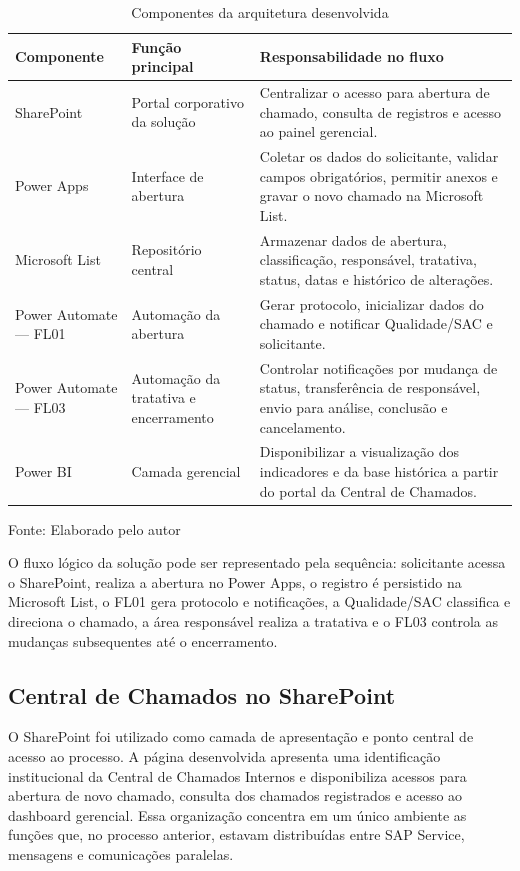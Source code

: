 \begin{table}[H]
\caption{Componentes da arquitetura desenvolvida}
\label{tab:arquitetura-desenvolvida}
\centering
\begin{tabular}{p{3.0cm} p{4.1cm} p{5.1cm}}
\hline
\textbf{Componente} & \textbf{Função principal} &
\textbf{Responsabilidade no fluxo} \\
\hline
SharePoint &
Portal corporativo da solução &
Centralizar o acesso para abertura de chamado, consulta de
registros e acesso ao painel gerencial. \\
\hline
Power Apps &
Interface de abertura &
Coletar os dados do solicitante, validar campos
obrigatórios, permitir anexos e gravar o novo chamado na
Microsoft List. \\
\hline
Microsoft List &
Repositório central &
Armazenar dados de abertura, classificação, responsável,
tratativa, status, datas e histórico de alterações. \\
\hline
Power Automate --- FL01 &
Automação da abertura &
Gerar protocolo, inicializar dados do chamado e notificar
Qualidade/SAC e solicitante. \\
\hline
Power Automate --- FL03 &
Automação da tratativa e encerramento &
Controlar notificações por mudança de status, transferência
de responsável, envio para análise, conclusão e
cancelamento. \\
\hline
Power BI &
Camada gerencial &
Disponibilizar a visualização dos indicadores e da base
histórica a partir do portal da Central de Chamados. \\
\hline
\end{tabular}
\raggedright
\par
{\fontsize{10}{12}\selectfont Fonte: Elaborado pelo autor}
\end{table}

O fluxo lógico da solução pode ser representado pela
sequência: solicitante acessa o SharePoint, realiza a
abertura no Power Apps, o registro é persistido na
Microsoft List, o FL01 gera protocolo e notificações, a
Qualidade/SAC classifica e direciona o chamado, a área
responsável realiza a tratativa e o FL03 controla as
mudanças subsequentes até o encerramento.

\subsection{Central de Chamados no SharePoint}

O SharePoint foi utilizado como camada de apresentação e
ponto central de acesso ao processo. A página desenvolvida
apresenta uma identificação institucional da Central de
Chamados Internos e disponibiliza acessos para abertura de
novo chamado, consulta dos chamados registrados e acesso ao
dashboard gerencial. Essa organização concentra em um único
ambiente as funções que, no processo anterior, estavam
distribuídas entre SAP Service, mensagens e comunicações
paralelas.

